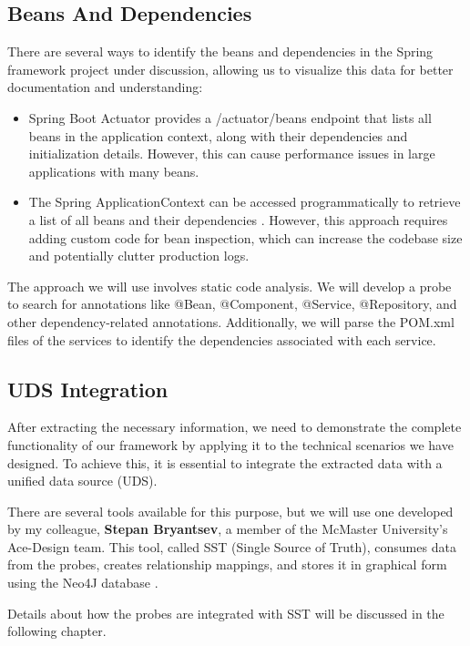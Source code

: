 \subsection{Beans And Dependencies}

There are several ways to identify the beans and dependencies in the Spring framework project under discussion, allowing us to visualize this data for better documentation and understanding:

\begin{itemize}
    \item Spring Boot Actuator provides a /actuator/beans endpoint that lists all beans in the application context, along with their dependencies and initialization details. However, this can cause performance issues in large applications with many beans.
    \item The Spring ApplicationContext can be accessed programmatically to retrieve a list of all beans and their dependencies \citep{baeldung_applicationcontext}. However, this approach requires adding custom code for bean inspection, which can increase the codebase size and potentially clutter production logs.
\end{itemize}

The approach we will use involves static code analysis. We will develop a probe to search for annotations like @Bean, @Component, @Service, @Repository, and other dependency-related annotations. Additionally, we will parse the POM.xml files of the services to identify the dependencies associated with each service.

\subsection{UDS Integration}

After extracting the necessary information, we need to demonstrate the complete functionality of our framework by applying it to the technical scenarios we have designed. To achieve this, it is essential to integrate the extracted data with a unified data source (UDS).

There are several tools available for this purpose, but we will use one developed by my colleague, \textbf{Stepan Bryantsev}, a member of the McMaster University's Ace-Design team. This tool, called SST (Single Source of Truth), consumes data from the probes, creates relationship mappings, and stores it in graphical form using the Neo4J database \citep{neo4j}.

Details about how the probes are integrated with SST will be discussed in the following chapter.

